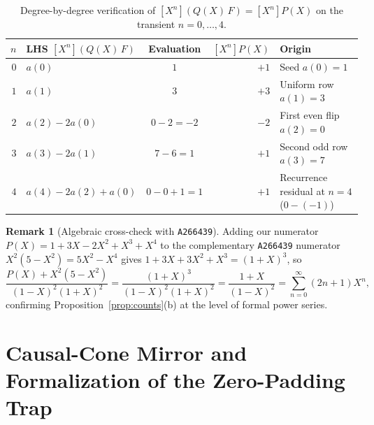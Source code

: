 \documentclass[11pt]{article}
\theoremstyle{definition}
\newtheorem{remark}[theorem]{Remark}
\newcommand{\seq}[1]{\texttt{#1}}
\begin{document}
\begin{table}[ht]
\centering
\caption{Degree-by-degree verification of $[X^n](Q(X)\,F) = [X^n]P(X)$ on the transient $n = 0, \dots, 4$.}
\label{tab:gf-transient}
\smallskip
{\small
\begin{tabular}{@{}r l c r l@{}}
\toprule
$n$ & LHS $[X^n](Q(X)\,F)$ & Evaluation & $[X^n]P(X)$ & Origin \\
\midrule
$0$ & $a(0)$ & $1$ & $+1$ & Seed $a(0) = 1$ \\
$1$ & $a(1)$ & $3$ & $+3$ & Uniform row $a(1) = 3$ \\
$2$ & $a(2) - 2a(0)$ & $0 - 2 = -2$ & $-2$ & First even flip $a(2) = 0$ \\
$3$ & $a(3) - 2a(1)$ & $7 - 6 = 1$ & $+1$ & Second odd row $a(3) = 7$ \\
$4$ & $a(4) - 2a(2) + a(0)$ & $0 - 0 + 1 = 1$ & $+1$ & Recurrence residual at $n = 4$ ($0 - (-1)$) \\
\bottomrule
\end{tabular}
}
\end{table}

\begin{remark}[Algebraic cross-check with \seq{A266439}]
Adding our numerator $P(X) = 1 + 3X - 2X^2 + X^3 + X^4$ to the complementary \seq{A266439} numerator $X^2(5 - X^2) = 5X^2 - X^4$ gives $1 + 3X + 3X^2 + X^3 = (1 + X)^3$, so
\[
\frac{P(X) + X^2(5 - X^2)}{(1 - X)^2(1 + X)^2} = \frac{(1 + X)^3}{(1 - X)^2(1 + X)^2} = \frac{1 + X}{(1 - X)^2} = \sum_{n=0}^{\infty} (2n + 1) X^n,
\]
confirming Proposition~\ref{prop:counts}(b) at the level of formal power series.
\end{remark}

\section{Causal-Cone Mirror and Formalization of the Zero-Padding Trap}
\label{sec:trap}
\end{document}

